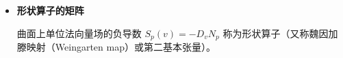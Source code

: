 \begin{itemize}
  \[
    \langle X_u,N_u\rangle=\langle X_u,D_uN\rangle
      =\langle D_uX_u,N\rangle=\langle X_{uu},N\rangle=e.
  \]
  类似地，有
  \[
    \begin{aligned}
      \langle X_u,N_u\rangle&=\langle X_{vu},N\rangle=e,\\
      \langle X_v,N_u\rangle&=\langle X_{vu},N\rangle=f,\\
      \langle X_v,N_v\rangle&=\langle X_{vv},N\rangle=g.
    \end{aligned}
  \]
  分别与 $X_u,X_v$ 作点积并求解下式，即可求得系数 $a_{ij}$：
  \begin{equation*}
    \begin{bmatrix}E&F\\F&G\end{bmatrix}
    \begin{bmatrix}a_{11}&a_{12}\\a_{21}&a_{22}\end{bmatrix}
    =\begin{bmatrix}e&f\\f&g\end{bmatrix}.
    \tag{5.10}\label{eq:5.10}
  \end{equation*}
  在有序基 $(X_u,X_v)$ 下写出两个基本形式的矩阵：
  \[
    \mathrm I=\begin{bmatrix}E&F\\F&G\end{bmatrix},\qquad
    \mathrm{II}=\begin{bmatrix}e&f\\f&g\end{bmatrix}.
  \]
  令
  \[
    \Delta=\det(\mathrm I)=EG-F^2=\lVert X_u\times X_v\rVert^2>0.
  \]
  任意切向量在同一组基下可写为
  \[
    v=v^1X_u+v^2X_v,\qquad w=w^1X_u+w^2X_v.
  \]
  \item \textbf{形状算子的矩阵}

  曲面上单位法向量场的负导数 $S_p(v)=-D_vN_p$ 称为形状算子（又称魏因加滕映射（Weingarten map）或第二基本张量）。


\end{itemize}

